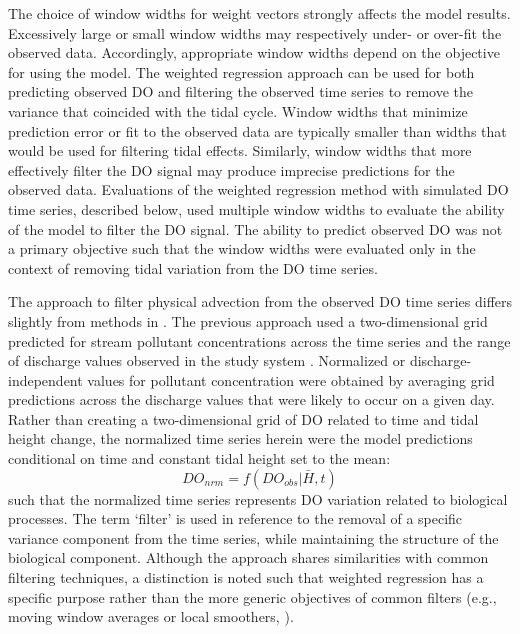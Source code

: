 \documentclass[letterpaper,12pt,oneside]{article}\usepackage[]{graphicx}\usepackage[]{color}
\begin{document}
The choice of window widths for weight vectors strongly affects the model results.  Excessively large or small window widths may respectively under- or over-fit the observed data.  Accordingly, appropriate window widths depend on the objective for using the model.  The weighted regression approach can be used for both predicting observed \ac{DO} and filtering the observed time series to remove the variance that coincided with the tidal cycle.  Window widths that minimize prediction error or fit to the observed data are typically smaller than widths that would be used for filtering tidal effects.  Similarly, window widths that more effectively filter the \ac{DO} signal may produce imprecise predictions for the observed data.  Evaluations of the weighted regression method with simulated \ac{DO} time series, described below, used multiple window widths to evaluate the ability of the model to filter the \ac{DO} signal.  The ability to predict observed \ac{DO} was not a primary objective such that the window widths were evaluated only in the context of removing tidal variation from the \ac{DO} time series.  

The approach to filter physical advection from the observed \ac{DO} time series differs slightly from methods in \citet{Hirsch10}.  The previous approach used a two-dimensional grid predicted for stream pollutant concentrations across the time series and the range of discharge values observed in the study system \citep{Hirsch10}.  Normalized or discharge-independent values for pollutant concentration were obtained by averaging grid predictions across the discharge values that were likely to occur on a given day.  Rather than creating a two-dimensional grid of \ac{DO} related to time and tidal height change, the normalized time series herein were the model predictions conditional on time and constant tidal height set to the mean:
\begin{equation} \label{do_nrm}
DO_{nrm} = f(DO_{obs}|\bar{H}, t)
\end{equation}
such that the normalized time series represents \ac{DO} variation related to biological processes.  The term `filter' is used in reference to the removal of a specific variance component from the time series, while maintaining the structure of the biological component.  Although the approach shares similarities with common filtering techniques, a distinction is noted such that weighted regression has a specific purpose rather than the more generic objectives of common filters (e.g., moving window averages or local smoothers, \citealt{Shumway11}).     
\end{document}
